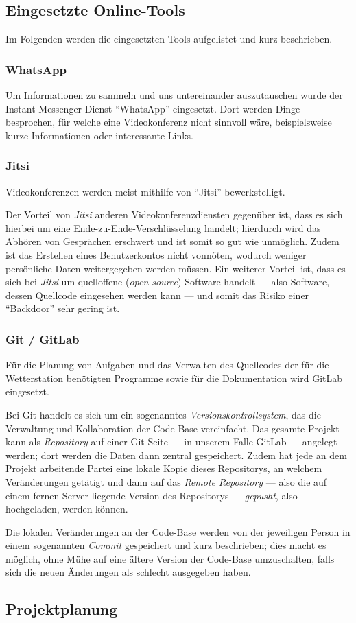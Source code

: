 \documentclass[a4paper,12pt]{article}
\begin{document}
\subsection{Eingesetzte Online-Tools}
Im Folgenden werden die eingesetzten Tools aufgelistet und kurz beschrieben.

\subsubsection{WhatsApp}
Um Informationen zu sammeln und uns untereinander auszutauschen wurde der Instant-Messenger-Dienst "`WhatsApp"' eingesetzt. Dort werden Dinge besprochen, für welche eine Videokonferenz nicht sinnvoll wäre, beispielsweise kurze Informationen oder interessante Links.

\subsubsection{Jitsi}
Videokonferenzen werden meist mithilfe von "`Jitsi"' bewerkstelligt.

Der Vorteil von \textit{Jitsi} anderen Videokonferenzdiensten gegenüber ist, dass es sich hierbei um eine Ende-zu-Ende-Verschlüsselung handelt; hierdurch wird das Abhören von Gesprächen erschwert und ist somit so gut wie unmöglich. Zudem ist das Erstellen eines Benutzerkontos nicht vonnöten, wodurch weniger persönliche Daten weitergegeben werden müssen. Ein weiterer Vorteil ist, dass es sich bei \textit{Jitsi} um quelloffene (\textit{open source}) Software handelt — also Software, dessen Quellcode eingesehen werden kann — und somit das Risiko einer "`Backdoor"' sehr gering ist.

\subsubsection{Git / GitLab}
Für die Planung von Aufgaben und das Verwalten des Quellcodes der für die Wetterstation benötigten Programme sowie für die Dokumentation wird GitLab eingesetzt.

Bei Git handelt es sich um ein sogenanntes \textit{Versionskontrollsystem}, das die Verwaltung und Kollaboration der Code-Base vereinfacht. 
Das gesamte Projekt kann als \textit{Repository} auf einer Git-Seite — in unserem Falle GitLab — angelegt werden; dort werden die Daten dann zentral gespeichert.
Zudem hat jede an dem Projekt arbeitende Partei eine lokale Kopie dieses Repositorys, an welchem Veränderungen getätigt und dann auf das \textit{Remote Repository} — also die auf einem fernen Server liegende Version des Repositorys — \textit{gepusht}, also hochgeladen, werden können.

Die lokalen Veränderungen an der Code-Base werden von der jeweiligen Person in einem sogenannten \textit{Commit} gespeichert und kurz beschrieben; dies macht es möglich, ohne Mühe auf eine ältere Version der Code-Base umzuschalten, falls sich die neuen Änderungen als schlecht ausgegeben haben.

\subsection{Projektplanung}
\end{document}
